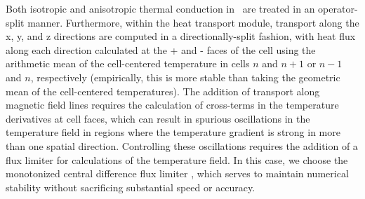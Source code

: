 Both isotropic and anisotropic thermal conduction in \enzo\ are
treated in an operator-split manner.  Furthermore, within the heat
transport module, transport along the x, y, and z directions are
computed in a directionally-split fashion, with heat flux along each
direction calculated at the + and - faces of the cell using the
arithmetic mean of the cell-centered temperature in cells $n$ and
$n+1$ or $n-1$ and $n$, respectively (empirically, this is more stable
than taking the geometric mean of the cell-centered temperatures).
The addition of transport along magnetic field lines requires the
calculation of cross-terms in the temperature derivatives at cell
faces, which can result in spurious oscillations in the temperature
field in regions where the temperature gradient is strong in more than
one spatial direction.  Controlling these oscillations requires the
addition of a flux limiter for calculations of the temperature field.
In this case, we choose the monotonized central difference flux
limiter \citep{1977JCoPh..23..263V}, which serves to maintain
numerical stability without sacrificing substantial speed or accuracy.
